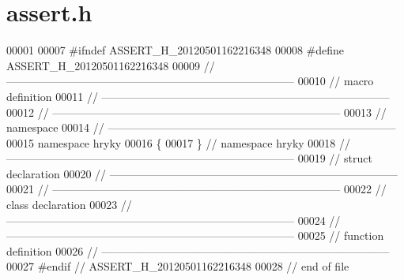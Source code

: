 \hypertarget{assert_8h_source}{\section{assert.\-h}
}

\begin{DoxyCode}
00001 
00007 \textcolor{preprocessor}{#ifndef ASSERT\_H\_20120501162216348}
00008 \textcolor{preprocessor}{}\textcolor{preprocessor}{#define ASSERT\_H\_20120501162216348}
00009 \textcolor{preprocessor}{}\textcolor{comment}{//
      ------------------------------------------------------------------------------}
00010 \textcolor{comment}{// macro definition}
00011 \textcolor{comment}{//
      ------------------------------------------------------------------------------}
00012 \textcolor{comment}{//
      ------------------------------------------------------------------------------}
00013 \textcolor{comment}{// namespace}
00014 \textcolor{comment}{//
      ------------------------------------------------------------------------------}
00015 \textcolor{keyword}{namespace }hryky
00016 \{
00017 \} \textcolor{comment}{// namespace hryky}
00018 \textcolor{comment}{//
      ------------------------------------------------------------------------------}
00019 \textcolor{comment}{// struct declaration}
00020 \textcolor{comment}{//
      ------------------------------------------------------------------------------}
00021 \textcolor{comment}{//
      ------------------------------------------------------------------------------}
00022 \textcolor{comment}{// class declaration}
00023 \textcolor{comment}{//
      ------------------------------------------------------------------------------}
00024 \textcolor{comment}{//
      ------------------------------------------------------------------------------}
00025 \textcolor{comment}{// function definition}
00026 \textcolor{comment}{//
      ------------------------------------------------------------------------------}
00027 \textcolor{preprocessor}{#endif // ASSERT\_H\_20120501162216348}
00028 \textcolor{preprocessor}{}\textcolor{comment}{// end of file}
\end{DoxyCode}
